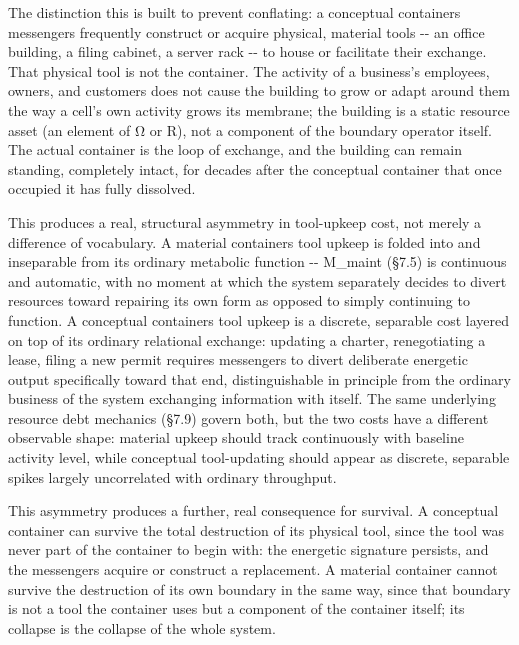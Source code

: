 \documentclass[
]{article}
\begin{document}
The distinction this is built to prevent conflating: a conceptual
containers messengers frequently construct or acquire physical, material
tools -\/- an office building, a filing cabinet, a server rack -\/- to
house or facilitate their exchange. That physical tool is not the
container. The activity of a business's employees, owners, and customers
does not cause the building to grow or adapt around them the way a cell's
own activity grows its membrane; the building is a static resource asset
(an element of Ω or R), not a component of the boundary operator itself.
The actual container is the loop of exchange, and the building can
remain standing, completely intact, for decades after the conceptual
container that once occupied it has fully dissolved.

This produces a real, structural asymmetry in tool-upkeep cost, not
merely a difference of vocabulary. A material containers tool upkeep is
folded into and inseparable from its ordinary metabolic function -\/-
M\_maint (§7.5) is continuous and automatic, with no moment at which the
system separately decides to divert resources toward repairing its own
form as opposed to simply continuing to function. A conceptual
containers tool upkeep is a discrete, separable cost layered on top of
its ordinary relational exchange: updating a charter, renegotiating a
lease, filing a new permit requires messengers to divert deliberate
energetic output specifically toward that end, distinguishable in
principle from the ordinary business of the system exchanging
information with itself. The same underlying resource debt mechanics
(§7.9) govern both, but the two costs have a different observable shape:
material upkeep should track continuously with baseline activity level,
while conceptual tool-updating should appear as discrete, separable
spikes largely uncorrelated with ordinary throughput.

This asymmetry produces a further, real consequence for survival. A
conceptual container can survive the total destruction of its physical
tool, since the tool was never part of the container to begin with: the
energetic signature persists, and the messengers acquire or construct a
replacement. A material container cannot survive the destruction of its
own boundary in the same way, since that boundary is not a tool the
container uses but a component of the container itself; its collapse is
the collapse of the whole system.
\end{document}

